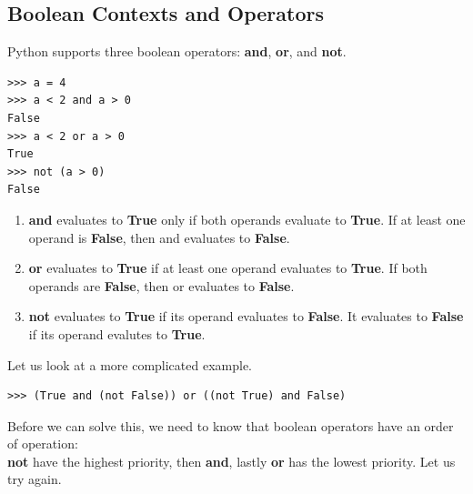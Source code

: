 \documentclass[11pt]{article}
\begin{document}
\subsection{Boolean Contexts and Operators}
Python supports three boolean operators: \textbf{and}, \textbf{or}, and \textbf{not}. 
\begin{lstlisting}
>>> a = 4
>>> a < 2 and a > 0
False
>>> a < 2 or a > 0 
True 
>>> not (a > 0) 
False
\end{lstlisting}
\begin{enumerate}
\item \textbf{and} evaluates to \textbf{True} only if both operands evaluate to \textbf{True}. If at least one operand is \textbf{False}, then and evaluates to \textbf{False}.
\item \textbf{or} evaluates to \textbf{True} if at least one operand evaluates to \textbf{True}. If both operands are \textbf{False}, then or evaluates to \textbf{False}.
\item \textbf{not} evaluates to \textbf{True} if its operand evaluates to \textbf{False}. It evaluates to \textbf{False} if its operand evalutes to \textbf{True}.
\end{enumerate}
Let us look at a more complicated example. 
\begin{lstlisting}
>>> (True and (not False)) or ((not True) and False) 
\end{lstlisting}
Before we can solve this, we need to know that boolean operators have an order of operation: \\
\textbf{not} have the highest priority, then \textbf{and}, lastly \textbf{or} has the lowest priority. Let us try again. \\ 
\end{document}

